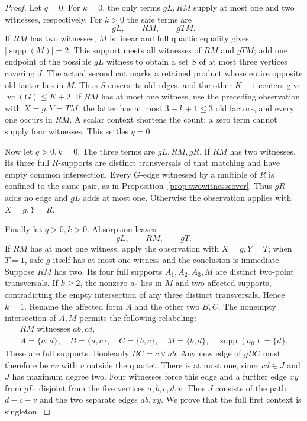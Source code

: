 \documentclass[11pt]{article}
\newcommand{\supp}{\operatorname{supp}}
\newcommand{\vc}{\operatorname{vc}}
\theoremstyle{definition}
\theoremstyle{remark}
\begin{document}
\begin{proof}
Let $q=0$. For $k=0$, the only terms $gL,RM$ supply at most one and two
witnesses, respectively. For $k>0$ the safe terms are
\[
 gL,\qquad RM,\qquad gTM.
\]
If $RM$ has two witnesses, $M$ is linear and full quartic equality gives
$|\supp(M)|=2$. This support meets all witnesses of $RM$ and $gTM$;
add one endpoint of the possible $gL$ witness to obtain a set $S$ of at
most three vertices covering $J$. The actual second cut marks a retained
product whose entire opposite old factor lies in $M$. Thus $S$ covers
its old edges, and the other $K-1$ centers give $\vc(G)\le K+2$.
If $RM$ has at most one witness, use the preceding observation with
$X=g,Y=TM$: the latter has at most $3-k+1\le3$ old factors, and every
one occurs in $RM$. A scalar context shortens the count; a zero term
cannot supply four witnesses. This settles $q=0$.

Now let $q>0,k=0$. The three terms are $gL,RM,gR$. If $RM$ has two
witnesses, its three full $R$-supports are distinct transversals of that
matching and have empty common intersection. Every $G$-edge witnessed by
a multiple of $R$ is confined to the same pair, as in
Proposition~\ref{prop:twowitnesscover}. Thus $gR$ adds no edge and $gL$
adds at most one. Otherwise the observation applies with $X=g,Y=R$.

Finally let $q>0,k>0$. Absorption leaves
\[
 gL,\qquad RM,\qquad gT.
\]
If $RM$ has at most one witness, apply the observation with $X=g,Y=T$;
when $T=1$, safe $g$ itself has at most one witness and the conclusion
is immediate. Suppose $RM$ has two. Its four full supports
$A_1,A_2,A_3,M$ are distinct two-point transversals. If $k\ge2$, the
nonzero $a_0$ lies in $M$ and two affected supports, contradicting the
empty intersection of any three distinct transversals. Hence $k=1$.
Rename the affected form $A$ and the other two $B,C$. The nonempty
intersection of $A,M$ permits the following relabeling:
\[
 \begin{gathered}
 RM\text{ witnesses }ab,cd,\\
 A=\{a,d\},\quad B=\{a,c\},\quad C=\{b,c\},
 \quad M=\{b,d\},\quad\supp(a_0)=\{d\}.
 \end{gathered}
\]
These are full supports. Booleanly $BC=c\vee ab$. Any new edge of
$gBC$ must therefore be $cv$ with $v$ outside the quartet. There is at
most one, since $cd\in J$ and $J$ has maximum degree two. Four witnesses
force this edge and a further edge $xy$ from $gL$, disjoint from the five
vertices $a,b,c,d,v$. Thus $J$ consists of the path $d-c-v$ and the two
separate edges $ab,xy$. We prove that the full first context is singleton.


\end{proof}
\end{document}
